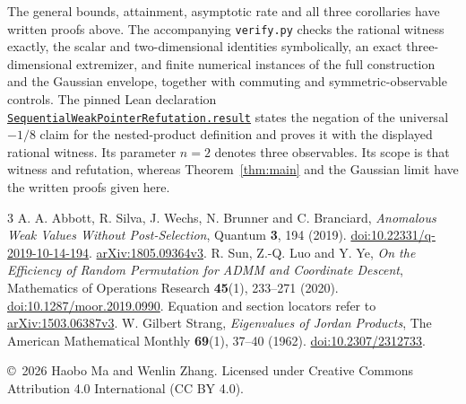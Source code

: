 \documentclass[11pt,a4paper]{article}
\begin{document}
The general bounds, attainment, asymptotic rate and all three corollaries
have written proofs above. The accompanying \texttt{verify.py}
checks the rational witness exactly, the scalar and two-dimensional
identities symbolically, an exact three-dimensional extremizer, and
finite numerical instances of the full construction and the Gaussian
envelope, together with commuting and symmetric-observable controls.
The pinned Lean declaration
\href{https://github.com/the-omega-institute/trureturing/blob/ea30c256f9857dcf2582db122a9570836d8a5f18/D5/S3/Quantum/Measurement/Weak/SequentialWeakPointerRefutation.lean}{\texttt{SequentialWeakPointerRefutation.result}}
states the negation of the universal $-1/8$ claim for the nested-product
definition and proves it with the displayed rational witness.
Its parameter $n=2$ denotes three observables. Its scope is that witness
and refutation, whereas Theorem~\ref{thm:main} and the Gaussian limit
have the written proofs given here.

\begin{thebibliography}{3}
A. A. Abbott, R. Silva, J. Wechs, N. Brunner and C. Branciard,
\emph{Anomalous Weak Values Without Post-Selection},
Quantum \textbf{3}, 194 (2019).
\href{https://doi.org/10.22331/q-2019-10-14-194}{doi:10.22331/q-2019-10-14-194}.
\href{https://arxiv.org/abs/1805.09364v3}{arXiv:1805.09364v3}.
R. Sun, Z.-Q. Luo and Y. Ye,
\emph{On the Efficiency of Random Permutation for ADMM and Coordinate Descent},
Mathematics of Operations Research \textbf{45}(1), 233--271 (2020).
\href{https://doi.org/10.1287/moor.2019.0990}{doi:10.1287/moor.2019.0990}.
Equation and section locators refer to
\href{https://arxiv.org/abs/1503.06387v3}{arXiv:1503.06387v3}.
W. Gilbert Strang,
\emph{Eigenvalues of Jordan Products},
The American Mathematical Monthly \textbf{69}(1), 37--40 (1962).
\href{https://doi.org/10.2307/2312733}{doi:10.2307/2312733}.
\end{thebibliography}
\noindent\small\copyright\ 2026 Haobo Ma and Wenlin Zhang.
Licensed under Creative Commons Attribution 4.0 International (CC BY 4.0).
\end{document}
